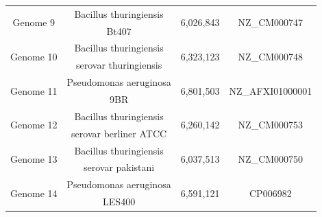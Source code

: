 \documentclass[preprint,12pt]{elsarticle}
\begin{document}
\begin{table}
\begin{center}
\begin{tabular}{c  c  c c}
\multirow{2}{*}{Genome 9}&Bacillus thuringiensis&   \multirow{2}{*}{6,026,843} &\multirow{2}{*}{ NZ\_CM000747 }\\    &Bt407&\\
\hline    

\multirow{2}{*}{Genome 10}&Bacillus thuringiensis& \multirow{2}{*}{6,323,123 } &\multirow{2}{*}{ NZ\_CM000748}\\    &serovar thuringiensis& \\
\hline
    
\multirow{2}{*}{Genome 11}&Pseudomonas aeruginosa& \multirow{2}{*}{6,801,503  } &\multirow{2}{*}{NZ\_AFXI01000001}\\    &9BR&\\
\hline
    
\multirow{2}{*}{Genome 12}&Bacillus thuringiensis&  \multirow{2}{*}{6,260,142  } &\multirow{2}{*}{ NZ\_CM000753}\\    &serovar berliner ATCC &\\
\hline
    
\multirow{2}{*}{Genome 13}&Bacillus thuringiensis& \multirow{2}{*}{6,037,513 } &\multirow{2}{*}{ NZ\_CM000750 }\\    &serovar pakistani&\\
\hline
    
\multirow{2}{*}{Genome 14}&Pseudomonas aeruginosa& \multirow{2}{*}{6,591,121  } &\multirow{2}{*}{ CP006982  }\\    &LES400&\\
\hline
\bottomrule
\end{tabular}
\end{center}
\end{table} 
\end{document}
